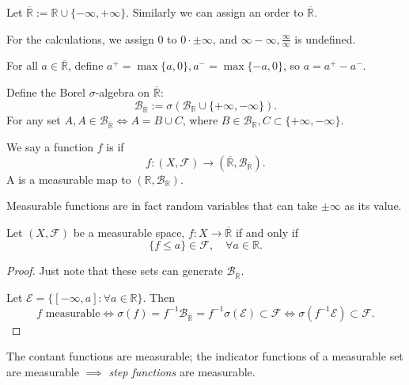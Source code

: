 \begin{definition}
	Let $ \overline{\mathbb{R}} := \mathbb{R}\cup \{-\infty,+\infty\}$.
	Similarly we can assign an order to $\overline{\mathbb{R}}$.

	For the calculations, we assign $0$ to  $0\cdot \pm \infty$,
	and $ \infty-\infty, \frac{\infty}{\infty}$ is undefined.
\end{definition}

For all $a\in \overline{\mathbb{R}}$, define
$a^+ = \max\{a,0\}, a^-=\max\{-a,0\}$, so $a = a^+ - a^-$.

Define the Borel $\sigma$-algebra on  $ \overline{\mathbb{R}}$:
\[
\mathscr{B}_{\overline{\mathbb{R}}} := \sigma(\mathscr{B}_{\mathbb{R}}\cup
\{+\infty,-\infty\}).
\]
For any set $A, A \in \mathscr{B}_{\overline{\mathbb{R}}} \iff A = B\cup C$,
where  $B\in \mathscr{B}_{\mathbb{R}}, C \subset\{+\infty,-\infty\}$.

\begin{definition}
	We say a function $f$ is  if
	\[
	f:(X,\mathscr{F})\to (\overline{\mathbb{R}}, \mathscr{B}_{\overline{\mathbb{R}}}).
	\]
	A  is a measurable map to $(\mathbb{R}, \mathscr{B}_{\mathbb{R}})$.
\end{definition}

Measurable functions are in fact random variables that can take
$\pm \infty$ as its value.

\begin{theorem}
    Let $(X,\mathscr{F})$ be a measurable space, $f:X\to \overline{\mathbb{R}}$
	if and only if
	\[
	\{f\le a\}\in \mathscr{F}, \quad \forall a\in \mathbb{R}.
	\]
\end{theorem}
\begin{proof}[Proof]
    Just note that these sets can generate $\mathscr{B}_{\overline{\mathbb{R}}}$.

	Let $\mathscr{E}=\{[-\infty, a]: \forall a\in \mathbb{R}\}$.
	Then
	\[
	f \text{ measurable} \iff \sigma(f) = f^{-1} \mathscr{B}_{\overline{\mathbb{R}}}
	= f^{-1} \sigma(\mathscr{E})\subset \mathscr{F} \iff
	\sigma(f^{-1} \mathscr{E}) \subset \mathscr{F}.
	\]
\end{proof}

\begin{example}
    The contant functions are measurable; the indicator functions of a
	measurable set are measurable $ \implies $ \textit{step functions}
	are measurable.
\end{example}

